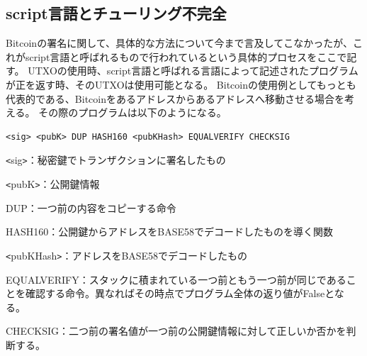 \subsection{script言語とチューリング不完全}
Bitcoinの署名に関して、具体的な方法について今まで言及してこなかったが、これがscript言語と呼ばれるもので行われているという具体的プロセスをここで記す。
UTXOの使用時、script言語と呼ばれる言語によって記述されたプログラムが正を返す時、そのUTXOは使用可能となる。
Bitcoinの使用例としてもっとも代表的である、Bitcoinをあるアドレスからあるアドレスへ移動させる場合を考える。
その際のプログラムは以下のようになる。
\begin{lstlisting}[caption=script言語,label=scripting]
<sig> <pubK> DUP HASH160 <pubKHash> EQUALVERIFY CHECKSIG
\end{lstlisting}
\begin{list}{}{}
\item \verb|<|sig\verb|>|：秘密鍵でトランザクションに署名したもの
\item \verb|<|pubK\verb|>|：公開鍵情報
\item DUP：一つ前の内容をコピーする命令
\item HASH160：公開鍵からアドレスをBASE58でデコードしたものを導く関数
\item \verb|<|pubKHash\verb|>|：アドレスをBASE58でデコードしたもの
\item EQUALVERIFY：スタックに積まれている一つ前ともう一つ前が同じであることを確認する命令。異なればその時点でプログラム全体の返り値がFalseとなる。
\item CHECKSIG：二つ前の署名値が一つ前の公開鍵情報に対して正しいか否かを判断する。
\end{list}

